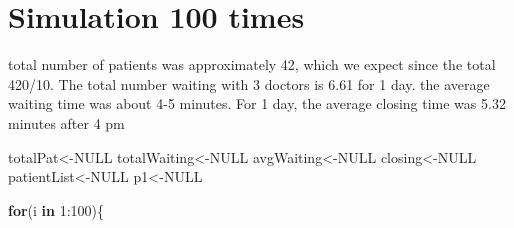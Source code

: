 \documentclass[
]{book}
\newenvironment{Shaded}{\begin{snugshade}}{\end{snugshade}}
\newcommand{\ConstantTok}[1]{\textcolor[rgb]{0.00,0.00,0.00}{#1}}
\newcommand{\ControlFlowTok}[1]{\textcolor[rgb]{0.13,0.29,0.53}{\textbf{#1}}}
\newcommand{\DecValTok}[1]{\textcolor[rgb]{0.00,0.00,0.81}{#1}}
\newcommand{\NormalTok}[1]{#1}
\newcommand{\OtherTok}[1]{\textcolor[rgb]{0.56,0.35,0.01}{#1}}
\newcommand{\SpecialCharTok}[1]{\textcolor[rgb]{0.00,0.00,0.00}{#1}}
\theoremstyle{definition}
\theoremstyle{definition}
\theoremstyle{definition}
\theoremstyle{definition}
\theoremstyle{remark}
\begin{document}
\hypertarget{simulation-100-times}{%
\section*{Simulation 100 times}\label{simulation-100-times}}

total number of patients was approximately 42, which we expect since the total 420/10. The total number waiting with 3 doctors is 6.61 for 1 day. the average waiting time was about 4-5 minutes. For 1 day, the average closing time was 5.32 minutes after 4 pm

\begin{Shaded}
\begin{Highlighting}[]
\NormalTok{ totalPat}\OtherTok{\textless{}{-}}\ConstantTok{NULL}
\NormalTok{ totalWaiting}\OtherTok{\textless{}{-}}\ConstantTok{NULL}
\NormalTok{ avgWaiting}\OtherTok{\textless{}{-}}\ConstantTok{NULL}
\NormalTok{ closing}\OtherTok{\textless{}{-}}\ConstantTok{NULL}
\NormalTok{ patientList}\OtherTok{\textless{}{-}}\ConstantTok{NULL}
\NormalTok{ p1}\OtherTok{\textless{}{-}}\ConstantTok{NULL}
 
\ControlFlowTok{for}\NormalTok{(i }\ControlFlowTok{in} \DecValTok{1}\SpecialCharTok{:}\DecValTok{100}\NormalTok{)\{}
  

\end{Highlighting}
\end{Shaded}
\end{document}
